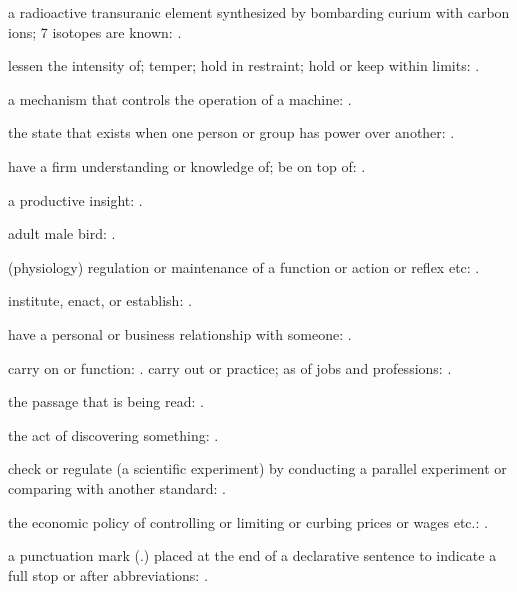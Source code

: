   a radioactive transuranic element synthesized by bombarding curium with carbon ions; 7 isotopes are known:   .

  lessen the intensity of; temper; hold in restraint; hold or keep within limits:   .

  a mechanism that controls the operation of a machine:   .

  the state that exists when one person or group has power over another:   .

  have a firm understanding or knowledge of; be on top of:   .

  a productive insight:   .

  adult male bird: .

  (physiology) regulation or maintenance of a function or action or reflex etc: .

  institute, enact, or establish:   .

  have a personal or business relationship with someone: .

  carry on or function:   . carry out or practice; as of jobs and professions:   .

  the passage that is being read: .

  the act of discovering something:   .

  check or regulate (a scientific experiment) by conducting a parallel experiment or comparing with another standard:   .

  the economic policy of controlling or limiting or curbing prices or wages etc.: .

  a punctuation mark (.) placed at the end of a declarative sentence to indicate a full stop or after abbreviations:   .

